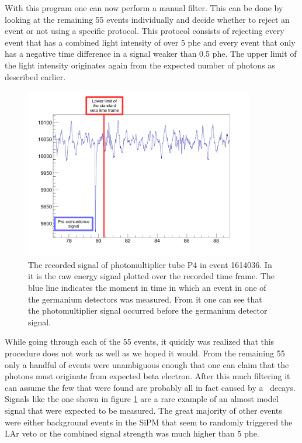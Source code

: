 With this program one can now perform a manual filter.
This can be done by looking at the remaining 55 events individually and decide whether to reject an event or not using a specific protocol.
This protocol consists of rejecting every event that has a combined light intensity of over 5 phe and every event that only has a negative time difference in a signal weaker than 0.5 phe.
The upper limit of the light intensity originates again from the expected number of photons as described earlier.
\\

\begin{figure}[t!]
	\centering
	\ifmakefigures%
	\includegraphics[width=100mm]{./Bilder/BeispielSignal.pdf}
	\fi%

	\caption{
    The recorded signal of photomultiplier tube P4 in event 1614036. 
    In it is the raw energy signal plotted over the recorded time frame. 
    The blue line indicates the moment in time in which an event in one of the germanium detectors was measured. 
    From it one can see that the photomultiplier signal occurred before the germanium detector signal.   
    }
    	\label{fig:BeispielSignal}
\end{figure}

While going through each of the 55 events, it quickly was realized that this procedure does not work as well as we hoped it would.
From the remaining 55 only a handful of events were unambiguous enough that one can claim that the photons must originate from expected beta electron.
After this much filtering it can assume the few that were found are probably all in fact caused by a \Kr\ decays.
Signals like the one shown in figure \ref{fig:BeispielSignal} are a rare example of an almost model signal that were expected to be measured.
The great majority of other events were either background events in the SiPM that seem to randomly triggered the LAr veto or the combined signal strength was much higher than 5 phe.\\

